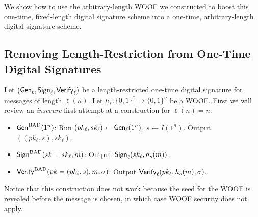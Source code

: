 We show how to use the arbitrary-length WOOF we constructed to boost this one-time, fixed-length digital signature scheme into a one-time, arbitrary-length digital signature scheme. 

\subsection{Removing Length-Restriction from One-Time Digital Signatures} 

Let $(\mathsf{Gen}_\ell, \mathsf{Sign}_\ell, \mathsf{Verify}_\ell)$ be a length-restricted one-time digital signature for messages of length $\ell(n)$. 
Let $h_s: \{0,1\}^* \to \{0,1\}^n$ be a WOOF. 
First we will review an \emph{insecure} first attempt at a construction for $\ell(n) = n$: 
\begin{itemize}
    \item $\mathsf{Gen}^{\text{BAD}}(1^n)$: Run $(pk_\ell, sk_\ell) \leftarrow \mathsf{Gen}_\ell(1^n)$, $s \leftarrow I(1^n)$. Output $((pk_\ell,s),sk_\ell)$.

    \item $\mathsf{Sign}^{\text{BAD}}(sk=sk_\ell, m)$: Output $\mathsf{Sign}_\ell(sk_\ell, h_s(m))$. 

    \item $\mathsf{Verify}^{\text{BAD}}(pk=(pk_\ell,s), m, \sigma)$: Output $\mathsf{Verify}_\ell(pk_\ell, h_s(m), \sigma)$. 
\end{itemize}
Notice that this construction does not work because the seed for the WOOF is revealed before the message is chosen, in which case WOOF security does not apply. 

